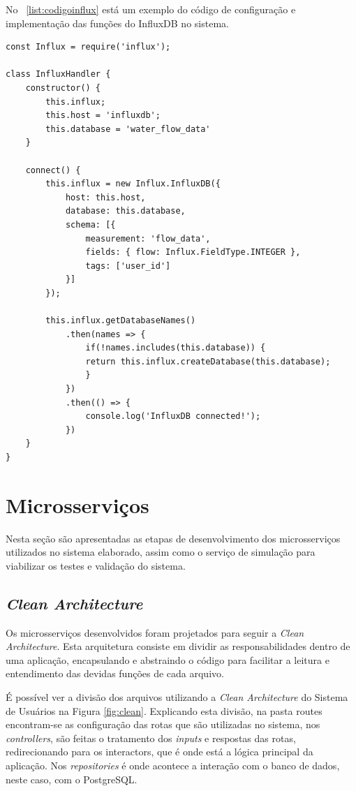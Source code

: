 No \lstlistingname\ \ref{list:codigoinflux} está um exemplo do código de configuração e implementação das funções do InfluxDB no sistema.


\begin{lstlisting}[label=list:codigoinflux, caption=Exemplo do código de configuração do InfluxDB]
const Influx = require('influx');

class InfluxHandler {
	constructor() {
		this.influx;
		this.host = 'influxdb';
		this.database = 'water_flow_data'
	}
	
	connect() {
		this.influx = new Influx.InfluxDB({
			host: this.host,
			database: this.database,
			schema: [{
				measurement: 'flow_data',
				fields: { flow: Influx.FieldType.INTEGER },
				tags: ['user_id']
			}]
		});
		
		this.influx.getDatabaseNames()
			.then(names => {
				if(!names.includes(this.database)) {
				return this.influx.createDatabase(this.database);
				}
			})
			.then(() => {
				console.log('InfluxDB connected!');
			})
	}
}
\end{lstlisting}

\section{Microsserviços}

Nesta seção são apresentadas as etapas de desenvolvimento dos microsserviços utilizados no sistema elaborado, assim como o serviço de simulação para viabilizar os testes e validação do sistema.

\subsection{\textit{Clean Architecture}}

Os microsserviços desenvolvidos foram projetados para seguir a \textit{Clean Architecture}. Esta arquitetura consiste em dividir as responsabilidades dentro de uma aplicação, encapsulando e abstraindo o código para facilitar a leitura e entendimento das devidas funções de cada arquivo.

É possível ver a divisão dos arquivos utilizando a \textit{Clean Architecture} do Sistema de Usuários na Figura \ref{fig:clean}. Explicando esta divisão, na pasta routes encontram-se as configuração das rotas que são utilizadas no sistema, nos \textit{controllers}, são feitas o tratamento dos \textit{inputs} e respostas das rotas, redirecionando para os interactors, que é onde está a lógica principal da aplicação. Nos \textit{repositories} é onde acontece a interação com o banco de dados, neste caso, com o PostgreSQL.

